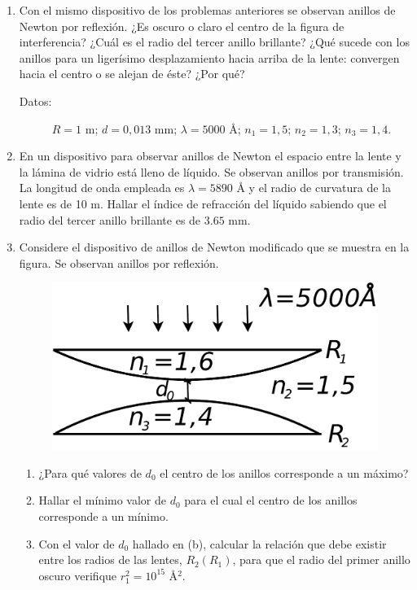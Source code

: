 \documentclass[11pt,spanish,a4paper]{article}
\begin{document}
\begin{enumerate}
\item Con el mismo dispositivo de los problemas anteriores se observan anillos
de Newton por reflexión. ¿Es oscuro o claro el centro de la figura
de interferencia? ¿Cuál es el radio del tercer anillo brillante? ¿Qué
sucede con los anillos para un ligerísimo desplazamiento hacia arriba
de la lente: convergen hacia el centro o se alejan de éste? ¿Por qué? 
\begin{description}
\item [{Datos:}] $R=1$ m; $d=0,013$ mm; $\lambda=5000$ Å; $n_{1}=1,5$;
$n_{2}=1,3$; $n_{3}=1,4$.
\end{description}


\item En un dispositivo para observar anillos de Newton el espacio entre
la lente y la lámina de vidrio está lleno de líquido. Se observan
anillos por transmisión. La longitud de onda empleada es $\lambda=5890$
Å y el radio de curvatura de la lente es de 10 m. Hallar el índice
de refracción del líquido sabiendo que el radio del tercer anillo
brillante es de $3.65$ mm. 


\item Considere el dispositivo de anillos de Newton modificado que se muestra
en la figura. Se observan anillos por reflexión. 
\begin{figure}[H]
\centering{}\includegraphics[clip,scale=0.25]{ej5-30}
\end{figure}
\begin{enumerate}
\item ¿Para qué valores de $d_{0}$ el centro de los anillos corresponde
a un máximo? 
\item Hallar el mínimo valor de $d_{0}$ para el cual el centro de los anillos
corresponde a un mínimo. 
\item Con el valor de $d_{0}$ hallado en (b), calcular la relación que
debe existir entre los radios de las lentes, $R_{2}(R_{1})$, para
que el radio del primer anillo oscuro verifique $r_{1}^{2}=10^{15}$
Å$^{2}$. 
\end{enumerate}


\end{enumerate}
\end{document}
